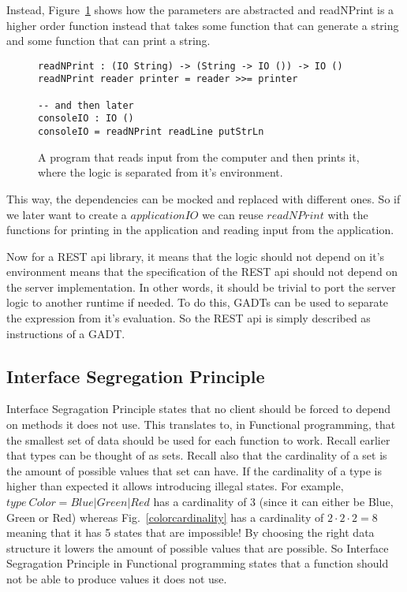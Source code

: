 Instead, Figure~\ref{withdiexample} shows how the parameters are abstracted and
readNPrint is a higher order function instead that takes some function that
can generate a string and some function that can print a string.


\begin{figure}[H]
    \begin{lstlisting}
readNPrint : (IO String) -> (String -> IO ()) -> IO ()
readNPrint reader printer = reader >>= printer

-- and then later
consoleIO : IO ()
consoleIO = readNPrint readLine putStrLn
    \end{lstlisting}
    \caption{A program that reads input from the computer and then prints it,
    where the logic is separated from it's environment.}
    \label{withdiexample}
\end{figure}

This way, the dependencies can be mocked and replaced with different ones. So if
we later want to create a $applicationIO$ we can reuse $readNPrint$ with the
functions for printing in the application and reading input from the
application.

Now for a REST api library, it means that the logic should not depend on it's
environment means that the specification of the REST api should not depend on
the server implementation. In other words, it should be trivial to port the
server logic to another runtime if needed. To do this, GADTs can be used to
separate the expression from it's evaluation. So the REST api is simply
described as instructions of a GADT. 

\subsection{Interface Segregation Principle} 

Interface Segragation Principle states that no client should be forced to depend
on methods it does not use. This translates to, in Functional
programming, that the smallest set of data should be used for each function to
work. Recall earlier that types can be thought of as sets. Recall also that the
cardinality of a set is the amount of possible values that set can have. If the
cardinality of a type is higher than expected it allows introducing illegal
states. For example, $type\ Color = Blue | Green | Red$ has a cardinality of 3
(since it can either be Blue, Green or Red) whereas Fig.~\ref{colorcardinality}
has a cardinality of $2\cdot 2\cdot 2 = 8$ meaning that it has 5 states that are
impossible! By choosing the right data structure it lowers the amount of
possible values that are possible. So Interface Segragation Principle in
Functional programming states that a function should not be able to produce
values it does not use.


